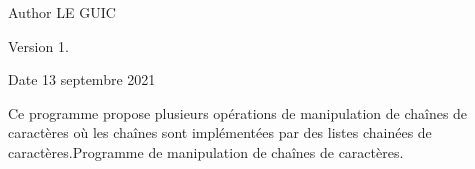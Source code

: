 \begin{DoxyAuthor}{Author}
LE GUIC 
\end{DoxyAuthor}
\begin{DoxyVersion}{Version}
1. 
\end{DoxyVersion}
\begin{DoxyDate}{Date}
13 septembre 2021
\end{DoxyDate}
Ce programme propose plusieurs opérations de manipulation de chaînes de caractères où les chaînes sont implémentées par des listes chainées de caractères.\+Programme de manipulation de chaînes de caractères. 